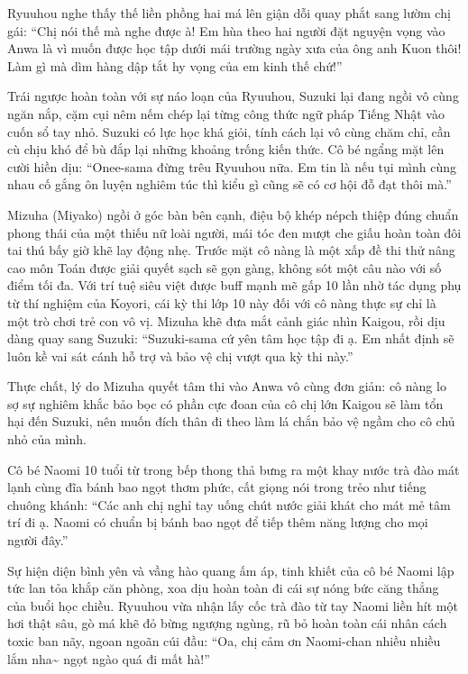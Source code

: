 \documentclass[../main.tex]{subfiles}
\begin{document}
Ryuuhou nghe thấy thế liền phồng hai má lên giận dỗi quay phắt sang lườm chị gái: ``Chị nói thế mà nghe được à! Em hùa theo hai người đặt nguyện vọng vào Anwa là vì muốn được học tập dưới mái trường ngày xưa của ông anh Kuon thôi! Làm gì mà dìm hàng dập tắt hy vọng của em kinh thế chứ!''

Trái ngược hoàn toàn với sự náo loạn của Ryuuhou, Suzuki lại đang ngồi vô cùng ngăn nắp, cặm cụi nêm nếm chép lại từng công thức ngữ pháp Tiếng Nhật vào cuốn sổ tay nhỏ. Suzuki có lực học khá giỏi, tính cách lại vô cùng chăm chỉ, cần cù chịu khó để bù đắp lại những khoảng trống kiến thức. Cô bé ngẩng mặt lên cười hiền dịu: ``Onee-sama đừng trêu Ryuuhou nữa. Em tin là nếu tụi mình cùng nhau cố gắng ôn luyện nghiêm túc thì kiểu gì cũng sẽ có cơ hội đỗ đạt thôi mà.''

Mizuha (Miyako) ngồi ở góc bàn bên cạnh, điệu bộ khép népch thiệp đúng chuẩn phong thái của một thiếu nữ loài người, mái tóc đen mượt che giấu hoàn toàn đôi tai thú bấy giờ khẽ lay động nhẹ. Trước mặt cô nàng là một xấp đề thi thử nâng cao môn Toán được giải quyết sạch sẽ gọn gàng, không sót một câu nào với số điểm tối đa. Với trí tuệ siêu việt được buff mạnh mẽ gấp 10 lần nhờ tác dụng phụ từ thí nghiệm của Koyori, cái kỳ thi lớp 10 này đối với cô nàng thực sự chỉ là một trò chơi trẻ con vô vị. Mizuha khẽ đưa mắt cảnh giác nhìn Kaigou, rồi dịu dàng quay sang Suzuki: ``Suzuki-sama cứ yên tâm học tập đi ạ. Em nhất định sẽ luôn kề vai sát cánh hỗ trợ và bảo vệ chị vượt qua kỳ thi này.''

Thực chất, lý do Mizuha quyết tâm thi vào Anwa vô cùng đơn giản: cô nàng lo sợ sự nghiêm khắc bảo bọc có phần cực đoan của cô chị lớn Kaigou sẽ làm tổn hại đến Suzuki, nên muốn đích thân đi theo làm lá chắn bảo vệ ngầm cho cô chủ nhỏ của mình.

Cô bé Naomi 10 tuổi từ trong bếp thong thả bưng ra một khay nước trà đào mát lạnh cùng đĩa bánh bao ngọt thơm phức, cất giọng nói trong trẻo như tiếng chuông khánh: ``Các anh chị nghỉ tay uống chút nước giải khát cho mát mẻ tâm trí đi ạ. Naomi có chuẩn bị bánh bao ngọt để tiếp thêm năng lượng cho mọi người đây.''

Sự hiện diện bình yên và vầng hào quang ấm áp, tinh khiết của cô bé Naomi lập tức lan tỏa khắp căn phòng, xoa dịu hoàn toàn đi cái sự nóng bức căng thẳng của buổi học chiều. Ryuuhou vừa nhận lấy cốc trà đào từ tay Naomi liền hít một hơi thật sâu, gò má khẽ đỏ bừng ngượng ngùng, rũ bỏ hoàn toàn cái nhân cách toxic ban nãy, ngoan ngoãn cúi đầu: ``Oa, chị cảm ơn Naomi-chan nhiều nhiều lắm nha\~{} ngọt ngào quá đi mất hà!''
\end{document}
